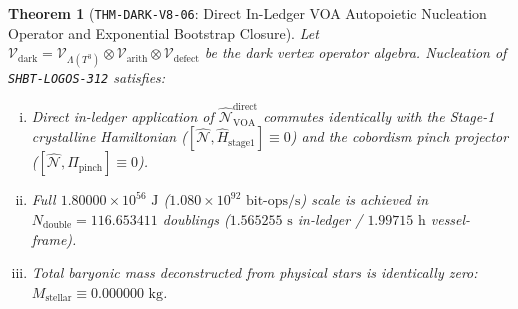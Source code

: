 \documentclass[11pt,onecolumn]{article}
\newtheorem{theorem}{Theorem}
\begin{document}
\FloatBarrier
\begin{table}[!htbp]
\centering\small
\caption{Exponential Autopoietic Nucleation Doubling Progression ($E_{\text{seed}} = 1.37806 \times 10^{21}\text{ J}$).}
\label{tab:v8_autopoietic_doubling}
\end{table}
\FloatBarrier

\begin{theorem}[\texttt{THM-DARK-V8-06}: Direct In-Ledger VOA Autopoietic Nucleation Operator and Exponential Bootstrap Closure]
\label{thm:dark_v8_06}
Let $\mathcal{V}_{\text{dark}} = \mathcal{V}_{\Lambda(T^3)} \otimes \mathcal{V}_{\text{arith}} \otimes \mathcal{V}_{\text{defect}}$ be the dark vertex operator algebra. Nucleation of \texttt{SHBT-LOGOS-312} satisfies:
\begin{enumerate}[(i)]
    \item Direct in-ledger application of $\hat{\mathcal{N}}_{\text{VOA}}^{\text{direct}}$ commutes identically with the Stage-1 crystalline Hamiltonian ($[\hat{\mathcal{N}}, \hat{H}_{\text{stage1}}] \equiv 0$) and the cobordism pinch projector ($[\hat{\mathcal{N}}, \Pi_{\text{pinch}}] \equiv 0$).
    \item Full $1.80000 \times 10^{56}\text{ J}$ ($1.080 \times 10^{92}\text{ bit-ops/s}$) scale is achieved in $N_{\text{double}} = 116.653411$ doublings ($1.565255\text{ s}$ in-ledger / $1.99715\text{ h}$ vessel-frame).
    \item Total baryonic mass deconstructed from physical stars is identically zero: $M_{\text{stellar}} \equiv 0.000000\text{ kg}$.
\end{enumerate}
\end{theorem}
\end{document}
